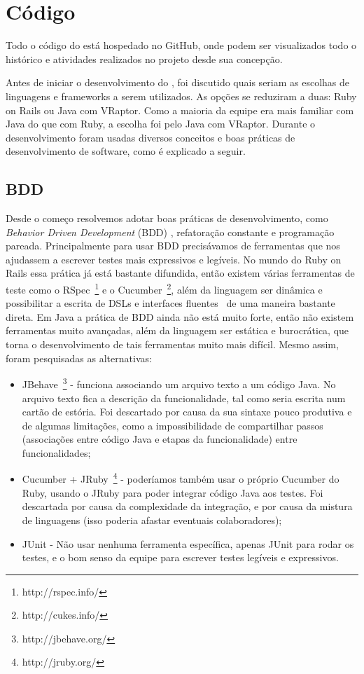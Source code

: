 \section{Código}

Todo o código do \calopsita está hospedado no GitHub, onde podem ser visualizados todo o histórico e atividades realizados no projeto desde sua concepção.

Antes de iniciar o desenvolvimento do \calopsita, foi discutido quais seriam as escolhas de linguagens e frameworks a serem utilizados. As opções se reduziram a duas: Ruby on Rails ou Java com VRaptor. Como a maioria da equipe era mais familiar com Java do que com Ruby, a escolha foi pelo Java com VRaptor. Durante o desenvolvimento foram usadas diversos conceitos e boas práticas de desenvolvimento de software, como é explicado a seguir.

\subsection{BDD} \label{bdd}
Desde o começo resolvemos adotar boas práticas de desenvolvimento, como {\it Behavior Driven Development} (BDD) \cite{bdd}, refatoração constante e programação pareada. Principalmente para usar BDD precisávamos de ferramentas que nos ajudassem a escrever testes mais expressivos e legíveis. No mundo do Ruby on Rails essa prática já está bastante difundida, então existem várias ferramentas de teste como o RSpec~\footnote{http://rspec.info/} e o Cucumber~\footnote{http://cukes.info/}, além da linguagem ser dinâmica e possibilitar a escrita de DSLs e interfaces fluentes~\cite{dsl} de uma maneira bastante direta. Em Java a prática de BDD ainda não está muito forte, então não existem ferramentas muito avançadas, além da linguagem ser estática e burocrática, que torna o desenvolvimento de tais ferramentas 
muito mais difícil. Mesmo assim, foram pesquisadas as alternativas:

\begin{itemize}
	\item{JBehave~\footnote{http://jbehave.org/} - funciona associando um arquivo texto a um código Java. No arquivo texto fica a descrição da funcionalidade, tal como seria escrita num cartão de estória. Foi descartado por causa da sua sintaxe pouco produtiva e de algumas limitações, como a impossibilidade de compartilhar passos (associações entre código Java e etapas da funcionalidade) entre funcionalidades;}
	\item{Cucumber + JRuby~\footnote{http://jruby.org/} - poderíamos também usar o próprio Cucumber do Ruby, usando o JRuby para poder integrar código Java aos testes. Foi descartada por causa da complexidade da integração, e por causa da mistura de linguagens (isso poderia afastar eventuais colaboradores);}
	\item{JUnit - Não usar nenhuma ferramenta específica, apenas JUnit para rodar os testes, e o bom senso da equipe para escrever testes legíveis e expressivos.}
\end{itemize}

